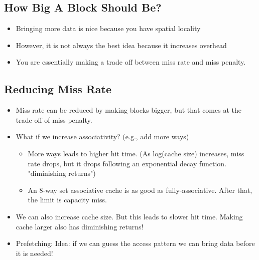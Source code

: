 \documentclass[10pt]{article}
\begin{document}
\subsection*{How Big A Block Should Be?}
\begin{itemize}
    \item Bringing more data is nice because you have spatial locality
    \item However, it is not always the best idea because it increases overhead
    \item You are essentially making a trade off between miss rate and miss penalty.
\end{itemize}

\subsection*{Reducing Miss Rate}
\begin{itemize}
    \item Miss rate can be reduced by making blocks bigger, but that comes at the trade-off of miss penalty.
    \item What if we increase associativity?  (e.g., add more ways)
    \begin{itemize}
        \item More ways leads to higher hit time.  (As log(cache size) increases, miss rate drops, but it drops following an exponential decay function.  "diminishing returns")
        \item An 8-way set associative cache is as good as fully-associative.  After that, the limit is capacity miss.
    \end{itemize}
    \item We can also increase cache size.  But this leads to slower hit time.  Making cache larger also has diminishing returns!
    \item Prefetching:  Idea: if we can guess the access pattern we can bring data before it is needed!
\end{itemize}
\end{document}
